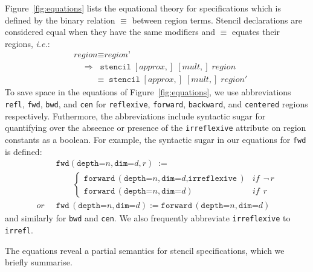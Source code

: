 \documentclass[9pt]{sigplanconf}
\theoremstyle{definition}
\newcommand{\ie}{\emph{i.e.}}
\newcommand{\term}[1]{\texttt{#1}}
\newcommand{\stenFwd}[3]{\term{forward} \, (\term{depth=}#1,
  \term{dim=}#2{#3})}
\newcommand{\irrefl}{\texttt{irreflexive}}
\newcommand{\stenFwdS}[2]{\term{fwd} \, (\term{depth=}#1,
  \term{dim=}#2)}
\newcommand{\irreflS}{\texttt{irrefl}}
\newcommand{\stenFwdSR}[3]{\term{fwd} (\term{depth=}#1,
  \term{dim=}#2, #3)}
\begin{document}
Figure~\ref{fig:equations} lists the equational theory for
specifications which is defined by the binary relation $\equiv$
between region terms. Stencil declarations are considered
equal when they have the same modifiers and $\equiv$ equates
their regions, \ie{}:
\begin{align*}
& \textit{region} \equiv \textit{region'} \\
& \quad \Rightarrow \;\; \texttt{stencil} \; [\textit{approx},] \; [\textit{mult},] \;
\textit{region} \\[-0.4em]
& \quad\quad \;\; \equiv \;\texttt{stencil} \; [\textit{approx},] \;
            [\textit{mult},] \; \textit{region}'
\end{align*}
%
To save space in the equations of Figure~\ref{fig:equations}, we use abbreviations
\term{refl}, \term{fwd}, \term{bwd}, and \term{cen} for \term{reflexive},
\term{forward}, \term{backward}, and \term{centered} regions
respectively. Futhermore, the abbreviations include syntactic sugar
for quantifying over the abseence or presence of the \irrefl{}
attribute on region constants as a boolean. For example,
the syntactic sugar in our equations for \term{fwd} is defined:
\begin{align*}
& \stenFwdSR{n}{d}{r}
\; := \; \\[-0.4em]
& \qquad \begin{cases}
\stenFwd{n}{d}{, \irrefl} & \textit{if} \;\, \neg \, r \\
\stenFwd{n}{d}{}  & \textit{if} \;\,  r
\end{cases} \\
\textit{or} \;\;
& \stenFwdS{n}{d} := \stenFwd{n}{d}{}
\end{align*}
%
and similarly for \term{bwd} and \term{cen}.
We also frequently abbreviate \irrefl{} to \irreflS{}.

The equations reveal a partial semantics for stencil
specifications, which we briefly summarise.
\end{document}
